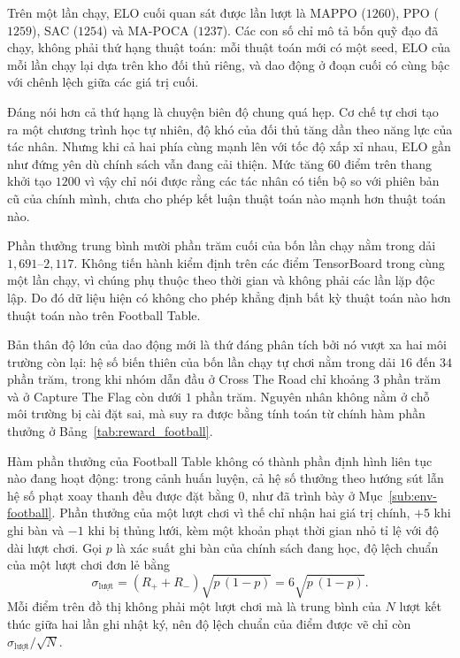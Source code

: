 \indent Trên một lần chạy, ELO cuối quan sát được lần lượt là MAPPO ($1260$), PPO ($1259$),
SAC ($1254$) và MA-POCA ($1237$). Các con số chỉ mô tả bốn quỹ đạo đã chạy, không phải thứ
hạng thuật toán: mỗi thuật toán mới có một seed, ELO của mỗi lần chạy lại dựa trên kho đối
thủ riêng, và dao động ở đoạn cuối có cùng bậc với chênh lệch giữa các giá trị cuối.

\indent Đáng nói hơn cả thứ hạng là chuyện biên độ chung quá hẹp. Cơ chế tự chơi tạo ra
một chương trình học tự nhiên, độ khó của đối thủ tăng dần theo năng lực của tác nhân.
Nhưng khi cả hai phía cùng mạnh lên với tốc độ xấp xỉ nhau, ELO gần như đứng yên dù chính
sách vẫn đang cải thiện. Mức tăng $60$ điểm trên thang khởi tạo $1200$ vì vậy chỉ nói
được rằng các tác nhân có tiến bộ so với phiên bản cũ của chính mình, chưa cho phép kết
luận thuật toán nào mạnh hơn thuật toán nào.

\indent Phần thưởng trung bình mười phần trăm cuối của bốn lần chạy nằm trong dải
$1{,}691$--$2{,}117$. Không tiến hành kiểm định trên các điểm TensorBoard trong cùng một
lần chạy, vì chúng phụ thuộc theo thời gian và không phải các lần lặp độc lập. Do đó dữ liệu
hiện có không cho phép khẳng định bất kỳ thuật toán nào hơn thuật toán nào trên Football Table.

\indent Bản thân độ lớn của dao động mới là thứ đáng phân tích bởi nó vượt xa hai môi trường
còn lại: hệ số biến thiên của bốn lần chạy tự chơi nằm trong dải $16$ đến $34$ phần trăm,
trong khi nhóm dẫn đầu ở Cross The Road chỉ khoảng $3$ phần trăm và ở Capture The Flag còn
dưới $1$ phần trăm. Nguyên nhân không nằm ở chỗ môi trường bị cài đặt sai, mà suy ra được
bằng tính toán từ chính hàm phần thưởng ở Bảng~\ref{tab:reward_football}.

\indent Hàm phần thưởng của Football Table không có thành phần định hình liên tục nào đang
hoạt động: trong cảnh huấn luyện, cả hệ số thưởng theo hướng sút lẫn hệ số phạt xoay thanh
đều được đặt bằng 0, như đã trình bày ở Mục~\ref{sub:env-football}. Phần thưởng của
một lượt chơi vì thế chỉ nhận hai giá trị chính, $+5$ khi ghi bàn và $-1$ khi bị thủng lưới,
kèm một khoản phạt thời gian nhỏ tỉ lệ với độ dài lượt chơi. Gọi $p$ là xác suất ghi bàn của
chính sách đang học, độ lệch chuẩn của một lượt chơi đơn lẻ bằng
\begin{equation}
\sigma_{\text{lượt}} = \left( R_{+} + R_{-} \right) \sqrt{p\,(1-p)} = 6\sqrt{p\,(1-p)} .
\label{eq:football-episode-std}
\end{equation}
Mỗi điểm trên đồ thị không phải một lượt chơi mà là trung bình của $N$ lượt kết thúc giữa hai
lần ghi nhật ký, nên độ lệch chuẩn của điểm được vẽ chỉ còn $\sigma_{\text{lượt}}/\sqrt{N}$.

